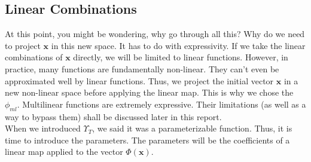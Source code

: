 \documentclass{article}
\theoremstyle{definition}
\theoremstyle{definition}
\begin{document}
\subsection{Linear Combinations}

At this point, you might be wondering, why go through all this? Why do we need to project $\mathbf{x}$ in this new space. It has to do with expressivity. If we take the linear combinations of $\mathbf{x}$ directly, we will be limited to linear functions. However, in practice, many functions are fundamentally non-linear. They can't even be approximated well by linear functions. Thus, we project the initial vector $\mathbf{x}$ in a new non-linear space before applying the linear map. This is why we chose the $\phi_{ml}$. Multilinear functions are extremely expressive. Their limitations (as well as a way to bypass them) shall be discussed later in this report. \\ When we introduced $\Upsilon_{T}$, we said it was a parameterizable function. Thus, it is time to introduce the parameters. The parameters will be the coefficients of a linear map applied to the vector $\Phi(\mathbf{x})$.\\ 
\end{document}
